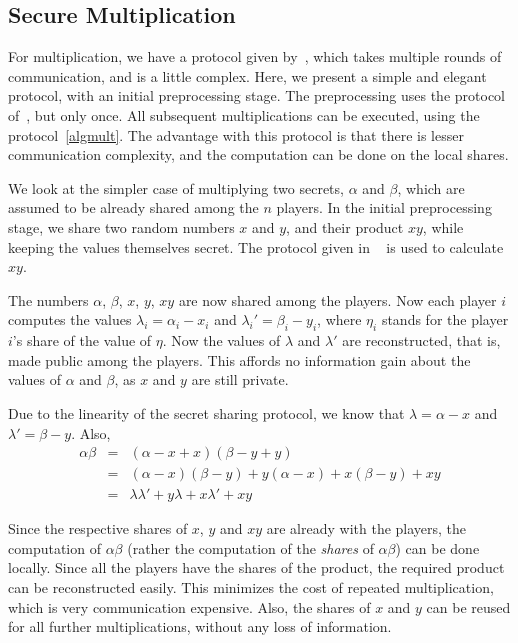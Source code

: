 \subsection{Secure Multiplication}
\label{sec:mult}

For multiplication, we have a protocol given by~\cite{GRR98:SVFMCwAtTC}, which takes multiple rounds of communication, and 
is a little complex. Here, we present a simple and elegant protocol, with an initial preprocessing stage. The
preprocessing uses the protocol of~\cite{GRR98:SVFMCwAtTC}, but only once. All subsequent multiplications can be executed, using
the protocol~\ref{algmult}. The advantage with this protocol is that there is lesser communication complexity, 
and the computation can be done on the local shares.

We look at the simpler case of multiplying two secrets, $\alpha$ and $\beta$, 
which are assumed to be already shared among the $n$ players. In the initial preprocessing stage, 
we share two random numbers $x$ and $y$, and their product $xy$, while keeping the values themselves secret. 
The protocol given in ~\cite{GRR98:SVFMCwAtTC} is used to calculate $xy$. 

The numbers $\alpha$, $\beta$, $x$, $y$, $xy$ are now shared among the players. Now each player $i$ computes the values 
$\lambda_{i} =  \alpha_{i} - x_{i}$ and $\lambda_{i}' = \beta_{i} - y_{i}$, where $\eta_{i}$ stands
for the player $i$'s share of the value of $\eta$. Now the values of $\lambda$ and $\lambda'$ are 
reconstructed, that is, made public among the players. This affords no information gain about the values
of $\alpha$ and $\beta$, as $x$ and $y$ are still private. 

Due to the linearity of the secret sharing protocol, we know that $\lambda = \alpha - x$ and $\lambda' = \beta - y$.
Also, 
\begin{eqnarray*}	
	\alpha\beta 	& = & (\alpha - x + x)(\beta - y + y) \\
			& = & (\alpha - x)(\beta - y) + y(\alpha - x) + x(\beta - y) + xy \\
			& = & \lambda\lambda' + y\lambda + x\lambda' + xy
\end{eqnarray*}

Since the respective shares of $x$, $y$ and $xy$ are already with the players, the computation of $\alpha\beta$
(rather the computation of the \emph{shares} of $\alpha\beta$) can be done locally. Since all the players have the shares of
the product, the required product can be reconstructed easily. This minimizes the cost of repeated multiplication,
which is very communication expensive. Also, the shares of $x$ and $y$ can be reused for all further multiplications,
without any loss of information.

